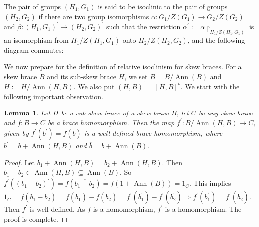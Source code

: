 \documentclass[11pt, oneside]{amsart}
\numberwithin{equation}{section}
\theoremstyle{plain}
\newtheorem{lem}[equation]{Lemma}
\theoremstyle{definition}
\newcommand{\Ann}{\operatorname{Ann} }
\begin{document}
The pair of groups $(H_1,G_1)$ is said to be isoclinic to the pair of groups $(H_2,G_2)$ if there are two group isomorphisms $\alpha:G_1/Z{(G_1)}\rightarrow G_2/Z{(G_2)}$ and $\beta:(H_1,G_1)^\prime\rightarrow(H_2,G_2)^\prime$ such that the restriction $\alpha^\prime:=\alpha{\restriction}_{H_1/Z{(H_1,G_1)}}$ is an isomorphism from $H_1/Z{(H_1,G_1)}$ onto $H_2/Z{(H_2,G_2)}$, and the following diagram commutes:
\begin{center}
\end{center}


We now prepare for the definition of relative isoclinism for skew braces. For a skew brace $B$ and its sub-skew brace $H$, we set $\overline{B}= B/\Ann(B)$ and $\overline{H}:= H/\Ann(H,B)$. We also put $(H,B)^\prime=[H,B]^b$. We start with the following important observation.
\begin{lem} %
    Let $H$ be a sub-skew brace of a skew brace $B$, let $C$ be any skew brace and $f: \overline{B} \rightarrow C$ be a brace homomorphism. Then the map $f^\prime :B/\Ann(H,B) \to C$, given by $f^\prime({b}^\prime)=f(\overline{b})$
    is a well-defined brace homomorphism, 
    where ${b}^\prime=b+\Ann(H,B)$ and $\overline{b}=b+ \Ann(B)$. 
\end{lem}
\begin{proof}
    Let $b_1+\Ann(H, B)=b_2+\Ann(H, B)$. Then $b_1-b_2\in \Ann(H, B)\subseteq \Ann(B)$. So $f^\prime({(b_1-b_2)}^\prime)=f(\overline{b_1-b_2})=f(1+\Ann(B))=1_C$. This implies $1_C=f(\overline{b_1-b_2})=f(\overline{b_1})-f(\overline{b_2})=f^\prime(b_1^\prime)-f^\prime (b_2^\prime)\Rightarrow f^\prime(b_1^\prime)=f^\prime (b_2^\prime)$. Then $f^\prime$ is well-defined. As $f$ is a homomorphism, $f^\prime$ is a homomorphism. The proof is complete.
\end{proof}

     
      
\end{document}
